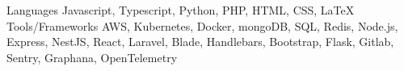 \begin{cvskills}
  \cvskill
  {Languages}
  {Javascript, Typescript, Python, PHP, HTML, CSS, \LaTeX}
  \cvskill
  {Tools/Frameworks}
  {AWS, Kubernetes, Docker, mongoDB, SQL, Redis, Node.js, Express, NestJS, React, Laravel, Blade, Handlebars, Bootstrap, Flask, Gitlab, Sentry, Graphana, OpenTelemetry}
\end{cvskills}  